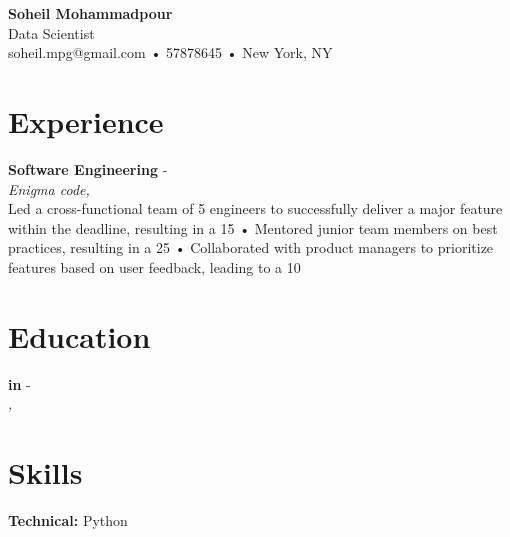 \documentclass[11pt,a4paper]{article}
\begin{document}
\begin{center}
\textbf{\Large Soheil Mohammadpour}\\[0.3em]
Data Scientist\\[0.3em]
soheil.mpg@gmail.com • 57878645 • New York, NY\\[0.2em]
 

\end{center}




\section*{Experience}

\noindent\textbf{Software Engineering} \hfill  - \\
\textit{Enigma code, }\\
Led a cross-functional team of 5 engineers to successfully deliver a major feature within the deadline, resulting in a 15%
• Mentored junior team members on best practices, resulting in a 25%
• Collaborated with product managers to prioritize features based on user feedback, leading to a 10%
\begin{itemize}

\end{itemize}



\section*{Education}

\noindent\textbf{ in } \hfill  - \\
\textit{, }\\

\begin{itemize}

\end{itemize}



\section*{Skills}

\textbf{Technical:} Python\\






\end{document}
